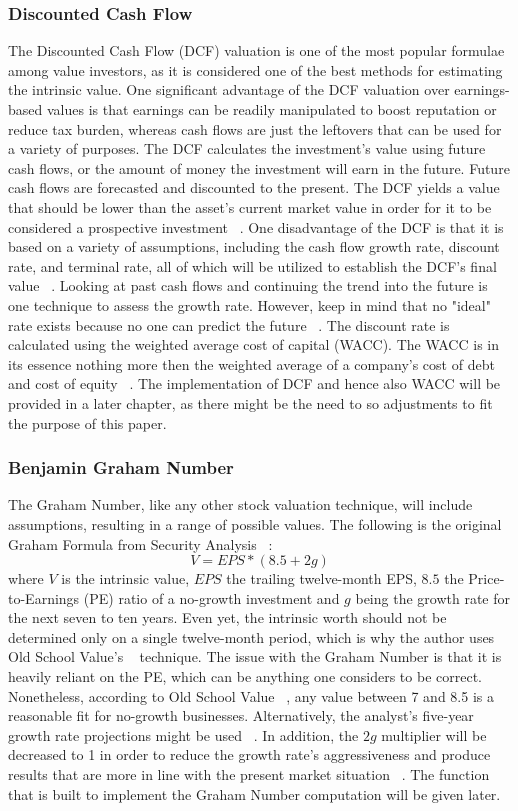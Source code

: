 \documentclass{imc-inf}
\begin{document}
\subsubsection{Discounted Cash Flow}
The Discounted Cash Flow (DCF) valuation is one of the most popular formulae among value investors, as it is considered one of the best methods for estimating the intrinsic value. One significant advantage of the DCF valuation over earnings-based values is that earnings can be readily manipulated to boost reputation or reduce tax burden, whereas cash flows are just the leftovers that can be used for a variety of purposes. The DCF calculates the investment's value using future cash flows, or the amount of money the investment will earn in the future. Future cash flows are forecasted and discounted to the present. The DCF yields a value that should be lower than the asset's current market value in order for it to be considered a prospective investment ~\cite{dcf}.
One disadvantage of the DCF is that it is based on a variety of assumptions, including the cash flow growth rate, discount rate, and terminal rate, all of which will be utilized to establish the DCF's final value ~\cite{dcf}.
Looking at past cash flows and continuing the trend into the future is one technique to assess the growth rate. However, keep in mind that no "ideal" rate exists because no one can predict the future ~\cite{dcf}.
The discount rate is calculated using the weighted average cost of capital (WACC). The WACC is in its essence nothing more then the weighted average of a company’s cost of debt and cost of equity ~\cite{dcf}. The implementation of DCF and hence also WACC will be provided in a later chapter, as there might be the need to so adjustments to fit the purpose of this paper.

\subsubsection{Benjamin Graham Number}
The Graham Number, like any other stock valuation technique, will include assumptions, resulting in a range of possible values. The following is the original Graham Formula from Security Analysis ~\cite{security_analysis}:
$$V = EPS * (8.5 + 2g)$$
where $V$ is the intrinsic value, $EPS$ the trailing twelve-month EPS, $8.5$ the Price-to-Earnings (PE) ratio of a no-growth investment and $g$ being the growth rate for the next seven to ten years. Even yet, the intrinsic worth should not be determined only on a single twelve-month period, which is why the author uses Old School Value’s ~\cite{ben_graham_formula} technique. The issue with the Graham Number is that it is heavily reliant on the PE, which can be anything one considers to be correct. Nonetheless, according to Old School Value ~\cite{ben_graham_formula}, any value between 7 and 8.5 is a reasonable fit for no-growth businesses. Alternatively, the analyst's five-year growth rate projections might be used ~\cite{ben_graham_formula}.
In addition, the $2g$ multiplier will be decreased to 1 in order to reduce the growth rate's aggressiveness and produce results that are more in line with the present market situation ~\cite{ben_graham_formula}. The function that is built to implement the Graham Number computation will be given later.
\end{document}
